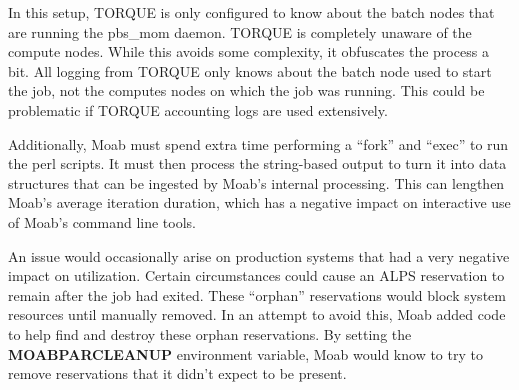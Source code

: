 In this setup, TORQUE is only configured to know about the batch nodes that are
running the pbs_mom daemon.  TORQUE is completely unaware of the compute nodes.
While this avoids some complexity, it obfuscates the process a bit.  All
logging from TORQUE only knows about the batch node used to start the job, not
the computes nodes on which the job was running.  This could be problematic if
TORQUE accounting logs are used extensively.

Additionally, Moab must spend extra time performing a ``fork'' and ``exec'' to
run the perl scripts.  It must then process the string-based output to turn it
into data structures that can be ingested by Moab's internal processing.  This
can lengthen Moab's average iteration duration, which has a negative impact on
interactive use of Moab's command line tools.

An issue would occasionally arise on production systems that had a very
negative impact on utilization.  Certain circumstances could cause an ALPS
reservation to remain after the job had exited.  These ``orphan'' reservations
would block system resources until manually removed.  In an attempt to avoid
this, Moab added code to help find and destroy these orphan reservations.  By
setting the \textbf{MOABPARCLEANUP} environment variable, Moab would know to
try to remove reservations that it didn't expect to be present.
